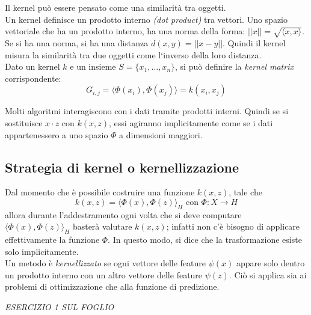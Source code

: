 Il kernel può essere pensato come una similarità tra oggetti.\\

Un kernel definisce un prodotto interno \textit{(dot product)} tra vettori. Uno spazio vettoriale che ha un prodotto interno, ha una norma della forma: $||x|| = \sqrt{\langle x, x \rangle}$. Se si ha una norma, si ha una distanza $d(x,y) = ||x-y||$. Quindi il kernel misura la similarità tra due oggetti come l‘inverso della loro distanza.\\

Dato un kernel $k$ e un insieme $S = \{x_1, \dots, x_n\}$, si può definire la \textit{kernel matrix} corrispondente: \[G_{i,j} = \langle \Phi(x_i), \Phi(x_j) \rangle = k(x_i, x_j)\]

Molti algoritmi interagiscono con i dati tramite prodotti interni.
Quindi se si sostituisce $x \cdot z$ con $k(x, z)$, essi agiranno implicitamente come se i dati appartenessero a uno spazio $\Phi$ a dimensioni maggiori. 

\subsection{Strategia di kernel o kernellizzazione}
Dal momento che è possibile costruire una funzione $k(x,z)$, tale che \[k(x,z) = \langle \Phi(x), \Phi(z)\rangle_H \mbox{ con }\Phi : X \to H\] allora durante l’addestramento ogni volta che si deve computare $\langle \Phi(x), \Phi(z) \rangle_H$ basterà valutare $k(x,z)$; infatti non c’è bisogno di applicare effettivamente la funzione $\Phi$. In questo modo, si dice che la trasformazione esiste solo implicitamente.\\

Un metodo è \textit{kernellizzato} se ogni vettore delle feature $\psi(x)$ appare solo dentro un prodotto interno con un altro vettore delle feature $\psi(z)$. Ciò si applica sia ai problemi di ottimizzazione che alla funzione di predizione.

\textit{ESERCIZIO 1 SUL FOGLIO}